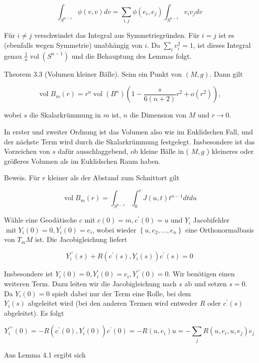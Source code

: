 \documentclass[10pt, letterpaper]{article}
\begin{document}
$$
\int_{S^{n-1}} \phi(v, v) d v=\sum_{i, j} \phi\left(e_{i}, e_{j}\right) \int_{S^{n-1}} v_{i} v_{j} d v
$$

Für $i \neq j$ verschwindet das Integral aus Symmetriegründen. Für $i=j$ ist es (ebenfalls wegen Symmetrie) unabhängig von $i$. Da $\sum_{i} v_{i}^{2}=1$, ist dieses Integral genau $\frac{1}{n} \operatorname{vol}\left(S^{n-1}\right)$ und die Behauptung des Lemmas folgt.

Theorem 3.3 (Volumen kleiner Bälle). Seim ein Punkt von $(M, g)$. Dann gilt

$$
\operatorname{vol} B_{m}(r)=r^{n} \operatorname{vol}\left(B^{n}\right)\left(1-\frac{s}{6(n+2)} r^{2}+o\left(r^{2}\right)\right),
$$

wobei $s$ die Skalarkrümmung in $m$ ist, $n$ die Dimension von $M$ und $r \rightarrow 0$.

In erster und zweiter Ordnung ist das Volumen also wie im Euklidschen Fall, und der nächste Term wird durch die Skalarkrümmung festgelegt. Insbesondere ist das Vorzeichen von $s$ dafür ausschlaggebend, ob kleine Bälle in ( $M, g$ ) kleineres oder größeres Volumen als im Euklidschen Raum haben.

Beweis. Für $r$ kleiner als der Abstand zum Schnittort gilt

$$
\operatorname{vol} B_{m}(r)=\int_{S^{n-1}} \int_{0}^{r} J(u, t) t^{n-1} d t d u
$$

Wähle eine Geodätische $c$ mit $c(0)=m, c^{\prime}(0)=u$ und $Y_{i}$ Jacobifelder $\operatorname{mit} Y_{i}(0)=0, Y_{i}^{\prime}(0)=e_{i}$, wobei wieder $\left\{u, e_{2}, \ldots, e_{n}\right\}$ eine Orthonormalbasis von $T_{m} M$ ist. Die Jacobigleichung liefert

$$
Y_{i}^{\prime \prime}(s)+R\left(c^{\prime}(s), Y_{i}(s)\right) c^{\prime}(s)=0
$$

Insbesondere ist $Y_{i}(0)=0, Y_{i}^{\prime}(0)=e_{i}, Y_{i}^{\prime \prime}(0)=0$. Wir benötigen einen weiteren Term. Dazu leiten wir die Jacobigleichung nach $s$ ab und setzen $s=0$. Da $Y_{i}(0)=0$ spielt dabei nur der Term eine Rolle, bei dem\\
$Y_{i}(s)$ abgeleitet wird (bei den anderen Termen wird entweder $R$ oder $c^{\prime}(s)$ abgeleitet). Es folgt

$$
Y_{i}^{\prime \prime \prime}(0)=-R\left(c^{\prime}(0), Y_{i}^{\prime}(0)\right) c^{\prime}(0)=-R\left(u, e_{i}\right) u=-\sum_{j} R\left(u, e_{i}, u, e_{j}\right) e_{j}
$$

Aus Lemma 4.1 ergibt sich
\end{document}
